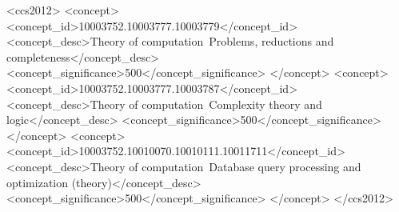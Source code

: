 \documentclass[nonacm]{acmart}
\begin{document}

\begin{CCSXML}
<ccs2012>
   <concept>
       <concept_id>10003752.10003777.10003779</concept_id>
       <concept_desc>Theory of computation~Problems, reductions and completeness</concept_desc>
       <concept_significance>500</concept_significance>
       </concept>
   <concept>
       <concept_id>10003752.10003777.10003787</concept_id>
       <concept_desc>Theory of computation~Complexity theory and logic</concept_desc>
       <concept_significance>500</concept_significance>
       </concept>
   <concept>
       <concept_id>10003752.10010070.10010111.10011711</concept_id>
       <concept_desc>Theory of computation~Database query processing and optimization (theory)</concept_desc>
       <concept_significance>500</concept_significance>
       </concept>
 </ccs2012>
\end{CCSXML}





\maketitle
\end{document}
